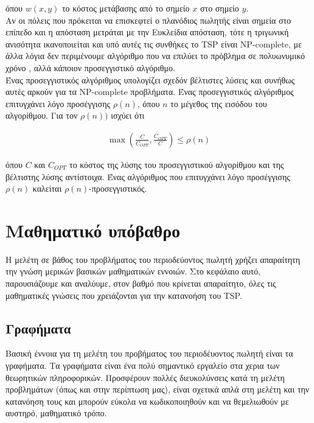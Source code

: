 \documentclass[oneside,12pt]{book}
\theoremstyle{definition}
\begin{document}
όπου \(w(x,y)\) το κόστος μετάβασης από το σημείο \(x\) στο σημείο \(y\). \\

Αν οι πόλεις που πρόκειται να επισκεφτεί ο πλανόδιος πωλητής είναι σημεία στο επίπεδο και η απόσταση μετράται με την Ευκλείδια απόσταση, τότε η τριγωνική ανισότητα ικανοποιείται και υπό αυτές τις συνθήκες το TSP είναι NP-complete, με άλλα λόγια δεν περιμένουμε αλγόριθμο που να επιλύει το πρόβλημα σε πολυωνυμικό χρόνο , αλλά κάποιον προσεγγιστικό αλγόριθμο. \\

Ένας προσεγγιστικός αλγόριθμος υπολογίζει σχεδόν βέλτιστες λύσεις και συνήθως αυτές αρκούν για τα NP-complete προβλήματα. Ένας προσεγγιστικός αλγόριθμος επιτυγχάνει λόγο προσέγγισης \(ρ(n)\), όπου \(n\) το μέγεθος της εισόδου του αλγορίθμου. Για τον \(ρ(n))\) ισχύει ότι

\begin{align*}
	\max\left(\frac{C}{C_{OPT}}, \frac{C_{OPT}}{C}\right) \leq ρ(n)
\end{align*}

όπου \(C\) και \(C_{OPT}\) το κόστος της λύσης του προσεγγιστικού αλγορίθμου και της βέλτιστης λύσης αντίστοιχα. Ένας αλγόριθμος που επιτυγχάνει λόγο προσέγγισης \(ρ(n)\) καλείται \(ρ(n)\)-προσεγγιστικός. \\

\chapter{Μαθηματικό υπόβαθρο}

Η μελέτη σε βάθος του προβλήματος του περιοδεύοντος πωλητή χρήζει απαραίτητη την γνώση μερικών βασικών μαθηματικών εννοιών. Στο κεφάλαιο αυτό, παρουσιάζουμε και αναλύυμε, στον βαθμό που κρίνεται απαραίτητο, όλες τις μαθηματικές γνώσεις που χρειάζονται για την κατανοήση του TSP. \\

\section{Γραφήματα}

Βασική έννοια για τη μελέτη του προβήματος του περιοδέυοντος πωλητή είναι τα γραφήματα. Τα γραφήματα είναι ένα πολύ σημαντικό εργαλείο στα χερια των θεωρητικών πληροφορικών. Προσφέρουν πολλές διευκολύνσεις κατά τη μελέτη προβλημάτων (όπως και στην περίπτωση μας), είναι σχετικά απλά στη μελέτη και την κατανόηση τους και μπορούν εύκολα να κωδικοποιηθούν και να θεμελιωθούν με αυστηρό, μαθηματικό τρόπο. \\
\end{document}
